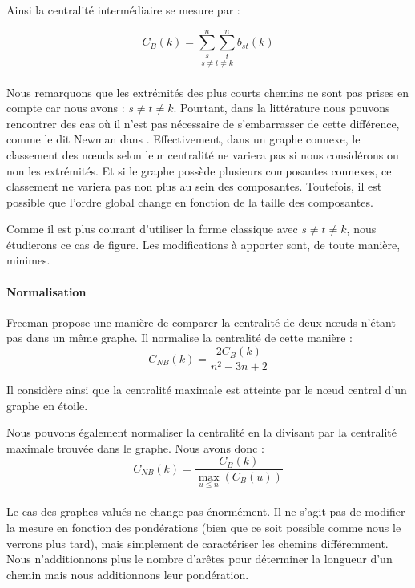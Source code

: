 \documentclass[a4paper, 10pt]{report}
\begin{document}
Ainsi la centralité intermédiaire se mesure par :

$$
C_{B}(k)=\underset{s\neq t\neq k}{\sum_s^{n}\sum_t^{n}}b_{st}(k)
$$


% 
% 

\paragraph{}Nous remarquons que les extrémités des plus courts chemins ne sont pas prises en compte car nous avons : $s\neq t\neq k$. Pourtant, dans la littérature nous pouvons rencontrer des cas où il n'est pas nécessaire de s'embarrasser de cette différence, comme le dit Newman dans \cite{Newman2010Networks}. Effectivement, dans un graphe connexe, le classement des n\oe uds selon leur centralité ne variera pas si nous considérons ou non les extrémités. Et si le graphe possède plusieurs composantes connexes, ce classement ne variera pas non plus au sein des composantes. Toutefois, il est possible que l'ordre global change en fonction de la taille des composantes.

Comme il est plus courant d'utiliser la forme classique avec $s\neq t\neq k$, nous étudierons ce cas de figure. Les modifications à apporter sont, de toute manière, minimes.


% 
% 

\paragraph{Normalisation}Freeman propose une manière de comparer la centralité de deux n\oe uds n'étant pas dans un même graphe. Il normalise la centralité de cette manière :
$$
C_{\mathit{NB}}(k)=\frac{2C_B(k)}{n^2-3n+2}
$$

Il considère ainsi que la centralité maximale est atteinte par le n\oe ud central d'un graphe en étoile.

Nous pouvons également normaliser la centralité en la divisant par la centralité maximale trouvée dans le graphe. Nous avons donc :
$$
C_{\mathit{NB}}(k)=\frac{C_B(k)}{\displaystyle \max_{u\leqslant n}(C_B(u))}
$$


% 
% 

\paragraph{}Le cas des graphes valués ne change pas énormément. Il ne s'agit pas de modifier la mesure en fonction des pondérations (bien que ce soit possible comme nous le verrons plus tard), mais simplement de caractériser les chemins différemment. Nous n'additionnons plus le nombre d'arêtes pour déterminer la longueur d'un chemin mais nous additionnons leur pondération.
\end{document}
